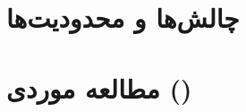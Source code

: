 
\section{ چالش‌ها و محدودیت‌ها}
\label{sec:ch5-challengesandlimitations}


\section{مطالعه موردی ()}
\label{sec:ch5-case-study}

